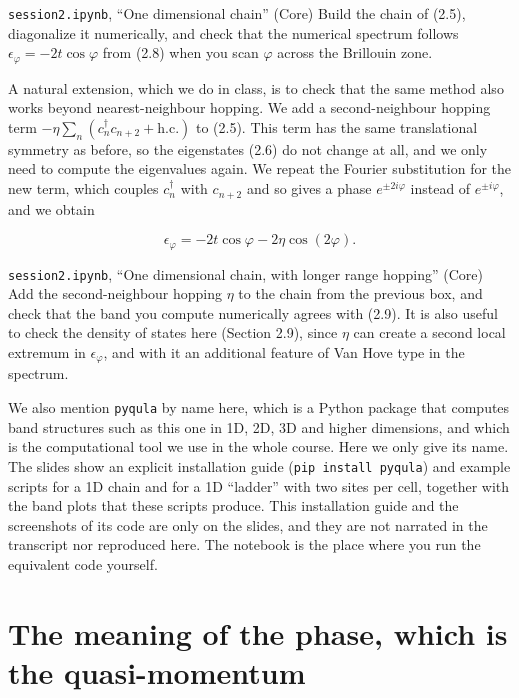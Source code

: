 \begin{notebookbox}{\texttt{session2.ipynb}, ``One dimensional chain'' (Core)}
Build the chain of (2.5), diagonalize it numerically, and check that the numerical spectrum follows
$\epsilon_\varphi=-2t\cos\varphi$ from (2.8) when you scan $\varphi$ across the Brillouin zone.
\end{notebookbox}

A natural extension, which we do in class, is to check that the same method also works beyond
nearest-neighbour hopping. We add a second-neighbour hopping term $-\eta\sum_n(c_n^\dagger
c_{n+2}+\text{h.c.})$ to (2.5). This term has the same translational symmetry as before, so the
eigenstates (2.6) do not change at all, and we only need to compute the eigenvalues again. We repeat
the Fourier substitution for the new term, which couples $c_n^\dagger$ with $c_{n+2}$ and so gives a
phase $e^{\pm2i\varphi}$ instead of $e^{\pm i\varphi}$, and we obtain

\begin{equation}\epsilon_\varphi = -2t\cos\varphi - 2\eta\cos(2\varphi).\end{equation}

\begin{notebookbox}{\texttt{session2.ipynb}, ``One dimensional chain, with longer range hopping'' (Core)}
Add the second-neighbour hopping $\eta$ to the chain from the previous box, and check that the band
you compute numerically agrees with (2.9). It is also useful to check the density of states here
(Section 2.9), since $\eta$ can create a second local extremum in $\epsilon_\varphi$, and with it an
additional feature of Van Hove type in the spectrum.
\end{notebookbox}

We also mention \texttt{pyqula} by name here, which is a Python package that computes band structures
such as this one in 1D, 2D, 3D and higher dimensions, and which is the computational tool we use in
the whole course. Here we only give its name. The slides show an explicit installation guide
(\texttt{pip install pyqula}) and example scripts for a 1D chain and for a 1D ``ladder'' with two
sites per cell, together with the band plots that these scripts produce. This installation guide and the screenshots of its code are only on the slides, and they are not narrated in the transcript nor reproduced here. The notebook is the place where you run the equivalent code
yourself.

\section{The meaning of the phase, which is the quasi-momentum}

